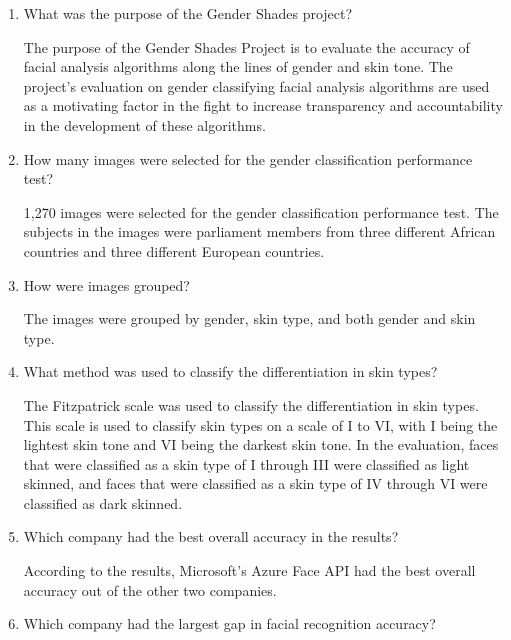 \documentclass[
]{article}
\author{}
\date{}
\begin{document}



\begin{enumerate}
\def\labelenumi{\arabic{enumi}.}
\item
  What was the purpose of the Gender Shades project?\par
\textcolor[rgb]{.25,.5,.75}{The purpose of the Gender Shades Project is to evaluate the accuracy of facial analysis algorithms along the lines of gender and skin tone. The project's evaluation on gender classifying facial analysis algorithms are used as a motivating factor in the fight to increase transparency and accountability in the development of these algorithms.}
\item
  How many images were selected for the gender classification
  performance test?\par
  \textcolor[rgb]{.25,.5,.75}{1,270 images were selected for the gender classification performance test. The subjects in the images were parliament members from three different African countries and three different European countries.}
\item
  How were images grouped?\par
  \textcolor[rgb]{.25,.5,.75}{The images were grouped by gender, skin type, and both gender and skin type.}
\item
  What method was used to classify the differentiation in skin types?\par
  \textcolor[rgb]{.25,.5,.75}{The Fitzpatrick scale was used to classify the differentiation in skin types. This scale is used to classify skin types on a scale of I to VI, with I being the lightest skin tone and VI being the darkest skin tone. In the evaluation, faces that were classified as a skin type of I through III were classified as light skinned, and faces that were classified as a skin type of IV through VI were classified as dark skinned.}
\item
  Which company had the best overall accuracy in the results?\par
  \textcolor[rgb]{.25,.5,.75}{According to the results, Microsoft's Azure Face API had the best overall accuracy out of the other two companies.}
\item
  Which company had the largest gap in facial recognition accuracy?\par

\end{enumerate}
\end{document}
